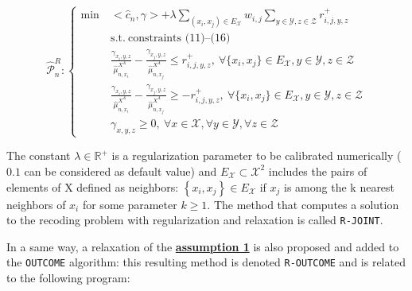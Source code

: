 \begin{equation}
 \widehat{\mathcal{P}}^R_n:    \left\{
     \begin{aligned}
          \min\: & <\widehat{c}_n,\gamma> + \lambda \sum_{(x_i,x_j)\in E_\mathcal{X}}      w_{i,j}\sum_{y\in\mathcal{Y},z\in\mathcal{Z}} r^+_{i,j,y,z}\\
            &\text{s.t.}\: \text{constraints }  \text{(11)--(16)} \\
            & \frac{\gamma_{x_i,y,z}}{\hat{\mu}^{X^A}_{n,x_i}}-\frac{\gamma_{x_j,y,z}}{\hat{\mu}^{X^A}_{n,x_j}} \leq r^+_{i,j,y,z}, \:\forall \{x_i,x_j\}\in E_\mathcal{X}, y\in\mathcal{Y}, z\in \mathcal{Z}\\
            &  \frac{\gamma_{x_i,y,z}}{\hat{\mu}^{X^A}_{n,x_i}}-\frac{\gamma_{x_j,y,z}}{\hat{\mu}^{X^A}_{n,x_j}} \geq -r^+_{i,j,y,z}, \:\forall \{x_i,x_j\}\in E_\mathcal{X}, y\in\mathcal{Y}, z\in \mathcal{Z}\\
             & \gamma_{x,y,z} \geq 0,  \:\forall x\in\mathcal{X}, \forall y\in \mathcal{Y}, \forall z\in \mathcal{Z}
     \end{aligned}\right.
 \label{eq:estimatemodelregularization}
 \end{equation}

The constant \(\lambda\in\mathbb{R}^+\) is a regularization parameter to be calibrated numerically (\(0.1\) can be considered as default value) and \(E_\mathcal{X}\subset \mathcal{X}^2\) includes the pairs of elements of X defined as neighbors: \(\left\{x_i, x_j\right\}\in E_\mathcal{X}\) if \(x_j\) is among the k nearest neighbors of \(x_i\) for some parameter \(k \geq 1\). The method that computes a solution to the recoding problem with regularization and relaxation is called \texttt{R-JOINT}.

In a same way, a relaxation of the \protect\hyperlink{optt}{\textbf{assumption 1}} is also proposed and added to the \texttt{OUTCOME} algorithm: this resulting method is denoted \texttt{R-OUTCOME} and is related to the following program:

